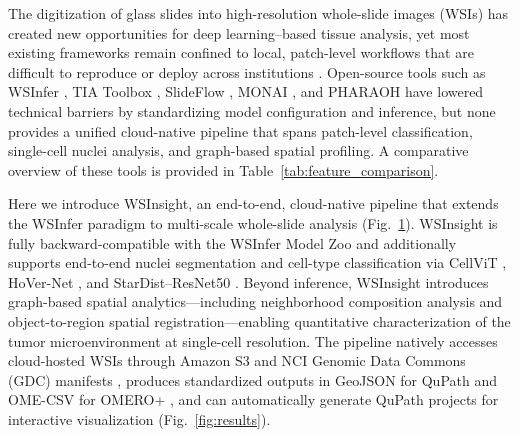 \documentclass[sn-mathphys-num]{sn-jnl}%
\theoremstyle{thmstyleone}%
\theoremstyle{thmstyletwo}%
\theoremstyle{thmstylethree}%
\begin{document}
	
	
	The digitization of glass slides into high-resolution whole-slide images (WSIs) has created new opportunities for deep learning--based tissue analysis, yet most existing frameworks remain confined to local, patch-level workflows that are difficult to reproduce or deploy across institutions \cite{Gupta:2019, Echle:2020, Laak:2021}. Open-source tools such as WSInfer \cite{Kaczmarzyk:2024}, TIA Toolbox \cite{Pocock:2022}, SlideFlow \cite{Dolezal:2024}, MONAI \cite{Cardoso:2022}, and PHARAOH \cite{Faust:2024} have lowered technical barriers by standardizing model configuration and inference, but none provides a unified cloud-native pipeline that spans patch-level classification, single-cell nuclei analysis, and graph-based spatial profiling. A comparative overview of these tools is provided in Table~\ref{tab:feature_comparison}.
	
	Here we introduce WSInsight, an end-to-end, cloud-native pipeline that extends the WSInfer paradigm to multi-scale whole-slide analysis (Fig.~\ref{fig:diagram}). WSInsight is fully backward-compatible with the WSInfer Model Zoo and additionally supports end-to-end nuclei segmentation and cell-type classification via CellViT \cite{Horst:2024}, HoVer-Net \cite{Graham:2019}, and StarDist--ResNet50 \cite{Schmidt:2018}. Beyond inference, WSInsight introduces graph-based spatial analytics---including neighborhood composition analysis and object-to-region spatial registration---enabling quantitative characterization of the tumor microenvironment at single-cell resolution. The pipeline natively accesses cloud-hosted WSIs through Amazon S3 and NCI Genomic Data Commons (GDC) manifests \cite{TheCancerGenomeAtlasProgramTCGA, CloudObjectStorage--AmazonS3--AmazonWebServices}, produces standardized outputs in GeoJSON for QuPath \cite{Bankhead:2017} and OME-CSV for OMERO+ \cite{Allan:2012}, and can automatically generate QuPath projects for interactive visualization (Fig.~\ref{fig:results}).
	
	\begin{figure}[tb!]%
		\centering%
		\label{fig:diagram}%
	\end{figure}
	
\end{document}
